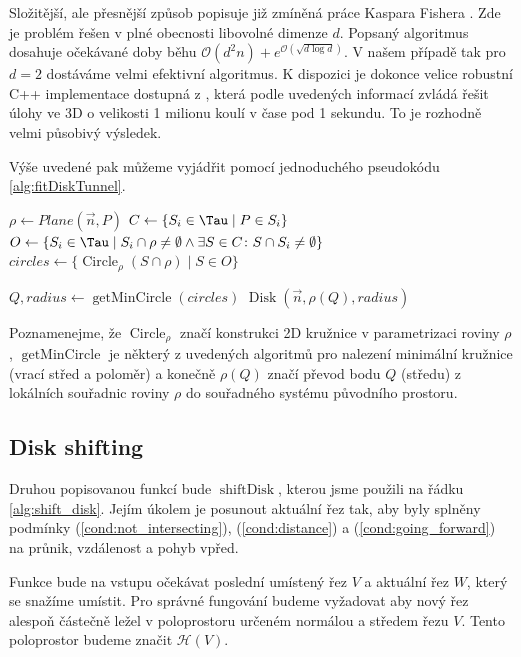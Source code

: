 Složitější, ale přesnější způsob popisuje již zmíněná práce Kaspara Fishera
\cite{FisherBalls}. Zde je problém řešen v plné obecnosti libovolné dimenze $ d $.
Popsaný algoritmus dosahuje očekávané doby běhu
$ \mathcal{O}(d^2n) + e^{\mathcal{O}(\sqrt{d \log{d}})} $. V našem případě tak pro
$ d = 2 $ dostáváme velmi efektivní algoritmus. K dispozici je dokonce velice
robustní C++ implementace dostupná z \cite{cpp_balls}, která podle uvedených informací
zvládá řešit úlohy ve 3D o velikosti 1 milionu koulí v čase pod 1 sekundu. To
je rozhodně velmi působivý výsledek.

Výše uvedené pak můžeme vyjádřit pomocí jednoduchého pseudokódu \ref{alg:fitDiskTunnel}.

\begin{algorithmic}[1]
\label{alg:fitDiskTunnel}

    \State $ \rho \gets Plane(\vec{n}, P) $
    \State $ C \gets \{S_i \in \Tau \mid P \in S_i \} $
    \State $ O \gets \{ S_i \in \Tau
        \mid S_i \cap \rho \neq \emptyset
            \wedge \exists S \in C \colon S \cap S_i \neq \emptyset  \} $
    \State $ circles \gets \{ \operatorname{Circle}_{\rho}(S \cap \rho) \mid S \in O \} $
    \State

    \State $ Q, radius \gets \operatorname{getMinCircle}(circles) $
    \State \Return $ \operatorname{Disk}(\vec{n}, \rho(Q), radius) $
\EndFunction

\end{algorithmic}

Poznamenejme, že $ \operatorname{Circle}_{\rho} $ značí konstrukci 2D kružnice
v parametrizaci roviny $ \rho $, $ \operatorname{getMinCircle} $ je některý z
uvedených algoritmů pro nalezení minimální kružnice (vrací střed a poloměr)
a konečně $ \rho(Q) $ značí převod bodu $ Q $ (středu) z lokálních souřadnic
roviny $ \rho $ do souřadného systému původního prostoru.


\subsection{Disk shifting}
Druhou popisovanou funkcí bude $ \operatorname{shiftDisk} $, kterou jsme použili
na řádku \ref{alg:shift_disk}. Jejím úkolem je posunout aktuální řez tak, aby
byly splněny podmínky (\ref{cond:not_intersecting}), (\ref{cond:distance})
a (\ref{cond:going_forward}) na průnik, vzdálenost a pohyb vpřed.

Funkce bude na vstupu očekávat poslední umístený řez $ V $ a aktuální řez $ W $,
který se snažíme umístit. Pro správné fungování budeme vyžadovat aby nový řez
alespoň částečně ležel v poloprostoru určeném normálou a středem řezu $ V $.
Tento poloprostor budeme značit $ \mathcal{H}(V) $.

